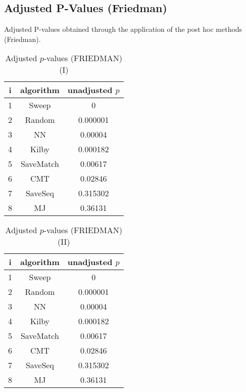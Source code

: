 \documentclass[a4paper,10pt]{article}
\begin{document}
\begin{landscape}
\section{Adjusted P-Values (Friedman)}


Adjusted P-values obtained through the application of the post hoc methods (Friedman).

\begin{table}[!htp]
\centering\small
\begin{tabular}{ccc}
i&algorithm&unadjusted $p$\\
\hline1&Sweep&0\\2&Random&0.000001\\3&NN&0.00004\\4&Kilby&0.000182\\5&SaveMatch&0.00617\\6&CMT&0.02846\\7&SaveSeq&0.315302\\8&MJ&0.36131\\\hline
\end{tabular}
\caption{Adjusted $p$-values (FRIEDMAN) (I)}
\end{table}
\begin{table}[!htp]
\centering\small
\begin{tabular}{ccc}
i&algorithm&unadjusted $p$\\
\hline1&Sweep&0\\2&Random&0.000001\\3&NN&0.00004\\4&Kilby&0.000182\\5&SaveMatch&0.00617\\6&CMT&0.02846\\7&SaveSeq&0.315302\\8&MJ&0.36131\\\hline
\end{tabular}
\caption{Adjusted $p$-values (FRIEDMAN) (II)}
\end{table}

\newpage
\end{landscape}
\end{document}

